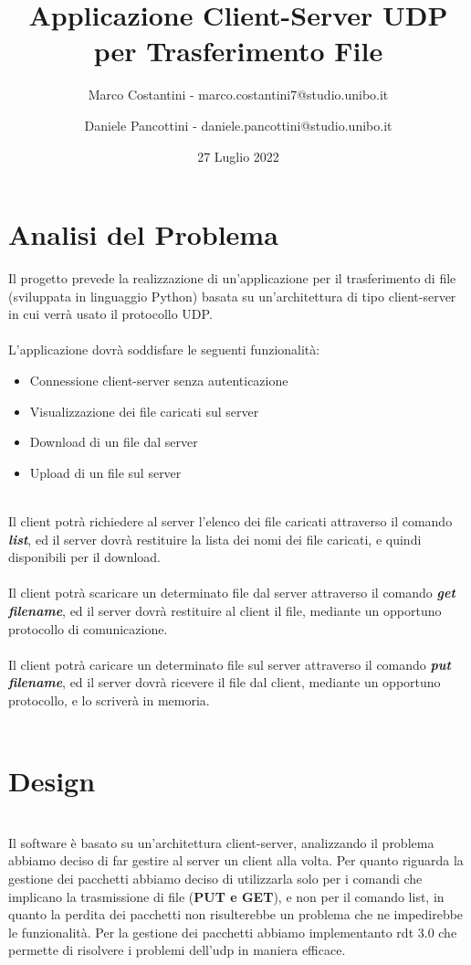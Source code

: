 \documentclass{article}
\title{Applicazione Client-Server UDP per Trasferimento File}
\author{Marco Costantini - marco.costantini7@studio.unibo.it \and Daniele Pancottini - daniele.pancottini@studio.unibo.it}
\date{27 Luglio 2022}
\begin{document}
\maketitle
\newpage

\tableofcontents

\newpage
\section{Analisi del Problema}


Il progetto prevede la realizzazione di un'applicazione per il trasferimento di file (sviluppata in linguaggio Python) basata su un'architettura di tipo client-server in cui verrà usato il protocollo UDP.\\\\
L'applicazione dovrà soddisfare le seguenti funzionalità:

	\begin{itemize}
		\item Connessione client-server senza autenticazione
		\item Visualizzazione dei file caricati sul server
		\item Download di un file dal server
		\item Upload di un file sul server
	\end{itemize}
\ \\
Il client potrà richiedere al server l'elenco dei file caricati attraverso il comando \textbf{\emph{list}}, ed il server dovrà restituire la lista dei nomi dei file caricati, e quindi disponibili per il download.\\\\
Il client potrà scaricare un determinato file dal server attraverso il comando \textbf{\emph{get filename}}, ed il server dovrà restituire al client il file, mediante un opportuno protocollo di comunicazione.\\\\
Il client potrà caricare un determinato file sul server attraverso il comando \textbf{\emph{put filename}}, ed il server dovrà ricevere il file dal client, mediante un opportuno protocollo, e lo scriverà in memoria.\\\\

\newpage
\section{Design}
\ \\
Il software è basato su un'architettura client-server, analizzando il problema abbiamo deciso di far gestire al server un client alla volta.
Per quanto riguarda la gestione dei pacchetti abbiamo deciso di utilizzarla solo per i comandi che implicano la trasmissione di file (\textbf{PUT e GET}), e non per il comando list, in quanto la perdita dei pacchetti non risulterebbe un problema che ne impedirebbe le funzionalità.
Per la gestione dei pacchetti abbiamo implementanto rdt 3.0 che permette di risolvere i problemi dell'udp in maniera efficace.
\end{document}
